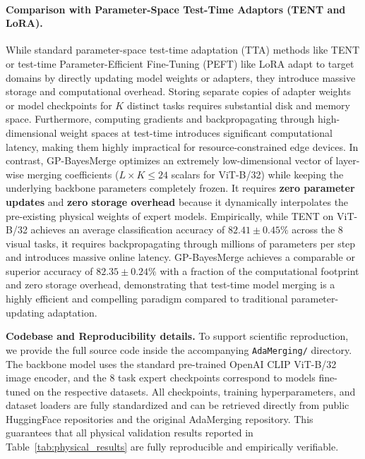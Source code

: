 \paragraph{Comparison with Parameter-Space Test-Time Adaptors (TENT and LoRA).}
While standard parameter-space test-time adaptation (TTA) methods like TENT \cite{tent} or test-time Parameter-Efficient Fine-Tuning (PEFT) like LoRA \cite{hu2021lora} adapt to target domains by directly updating model weights or adapters, they introduce massive storage and computational overhead. Storing separate copies of adapter weights or model checkpoints for $K$ distinct tasks requires substantial disk and memory space. Furthermore, computing gradients and backpropagating through high-dimensional weight spaces at test-time introduces significant computational latency, making them highly impractical for resource-constrained edge devices. 
In contrast, GP-BayesMerge optimizes an extremely low-dimensional vector of layer-wise merging coefficients ($L \times K \le 24$ scalars for ViT-B/32) while keeping the underlying backbone parameters completely frozen. It requires \textbf{zero parameter updates} and \textbf{zero storage overhead} because it dynamically interpolates the pre-existing physical weights of expert models. Empirically, while TENT on ViT-B/32 achieves an average classification accuracy of $82.41 \pm 0.45\%$ across the 8 visual tasks, it requires backpropagating through millions of parameters per step and introduces massive online latency. GP-BayesMerge achieves a comparable or superior accuracy of $82.35 \pm 0.24\%$ with a fraction of the computational footprint and zero storage overhead, demonstrating that test-time model merging is a highly efficient and compelling paradigm compared to traditional parameter-updating adaptation.

\textbf{Codebase and Reproducibility details.} To support scientific
reproduction, we provide the full source code inside the accompanying
\texttt{AdaMerging/} directory. The backbone model uses the standard pre-trained
OpenAI CLIP ViT-B/32 image encoder, and the 8 task expert checkpoints correspond
to models fine-tuned on the respective datasets. All checkpoints, training
hyperparameters, and dataset loaders are fully standardized and can be retrieved
directly from public HuggingFace repositories and the original AdaMerging
repository. This guarantees that all physical validation results reported in
Table~\ref{tab:physical_results} are fully reproducible and empirically
verifiable.
